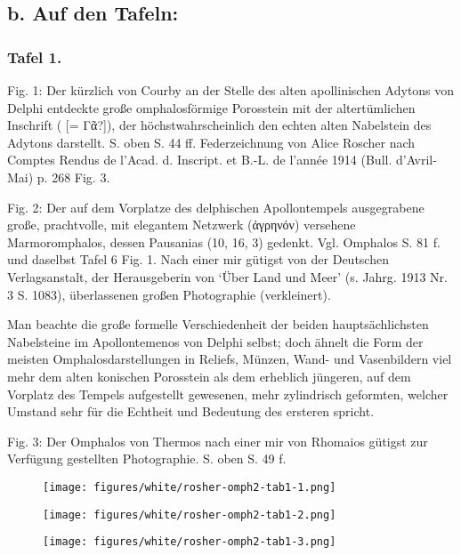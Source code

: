 \documentclass[a4paper, 11pt, oneside]{article}
\newcommand*\svgAAA{}
\begin{document}
\subsection{b. Auf den Tafeln:}
\clearpage
\subsubsection{Tafel 1.}

Fig. 1: Der kürzlich von Courby an der Stelle des alten apollinischen Adytons von Delphi entdeckte große omphalosförmige Porosstein mit der altertümlichen Inschrift ($\svgAAA$ [= Γᾶ?]), der höchstwahrscheinlich den echten alten Nabelstein des Adytons darstellt. S. oben S. 44 ff. Federzeichnung von Alice Roscher nach Comptes Rendus de l'Acad. d. Inscript. et B.-L. de l'année 1914 (Bull. d'Avril-Mai) p. 268 Fig. 3.

Fig. 2: Der auf dem Vorplatze des delphischen Apollontempels ausgegrabene große, prachtvolle, mit elegantem Netzwerk (ἀγρηνόν) versehene Marmoromphalos, dessen Pausanias (10, 16, 3) gedenkt. Vgl. Omphalos S. 81 f. und daselbst Tafel 6 Fig. 1. Nach einer mir gütigst von der Deutschen Verlagsanstalt, der Herausgeberin von `Über Land und Meer' (s. Jahrg. 1913 Nr. 3 S. 1083), überlassenen großen Photographie (verkleinert).

Man beachte die große formelle Verschiedenheit der beiden hauptsächlichsten Nabelsteine im Apollontemenos von Delphi selbst; doch ähnelt die Form der meisten Omphalosdarstellungen in Reliefs, Münzen, Wand- und Vasenbildern viel mehr dem alten konischen Porosstein als dem erheblich jüngeren, auf dem Vorplatz des Tempels aufgestellt gewesenen, mehr zylindrisch geformten, welcher Umstand sehr für die Echtheit und Bedeutung des ersteren spricht.

Fig. 3: Der Omphalos von Thermos nach einer mir von Rhomaios gütigst zur Verfügung gestellten Photographie. S. oben S. 49 f.
\clearpage
\vspace*{\fill}
\begin{figure}[H]
\centering
\texttt{[image: figures/white/rosher-omph2-tab1-1.png]}
\caption{}
\end{figure}
\vspace*{\fill}
\clearpage
\vspace*{\fill}
\begin{figure}[H]
\centering
\texttt{[image: figures/white/rosher-omph2-tab1-2.png]}
\caption{}
\end{figure}
\vspace*{\fill}
\clearpage
\vspace*{\fill}
\begin{figure}[H]
\centering
\texttt{[image: figures/white/rosher-omph2-tab1-3.png]}
\caption{}
\end{figure}
\vspace*{\fill}
\clearpage
\end{document}
